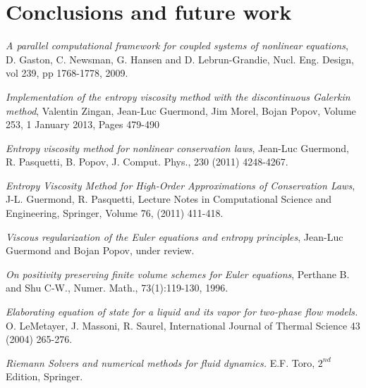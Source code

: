 \documentclass{article}
\begin{document}
\section{Conclusions and future work}
\newpage
{}
\begin{thebibliography}{7}
    
  \emph{A parallel computational framework for coupled systems of nonlinear equations},
  D. Gaston, C. Newsman, G. Hansen and D. Lebrun-Grandie, Nucl. Eng. Design, vol 239, pp 1768-1778, 2009.
  
  \emph{Implementation of the entropy viscosity method with the discontinuous Galerkin method},
  Valentin Zingan, Jean-Luc Guermond, Jim Morel, Bojan Popov, Volume 253, 1 January 2013, Pages 479-490
  
  {\em Entropy viscosity method for nonlinear conservation laws}, 
  Jean-Luc Guermond, R. Pasquetti, B. Popov, J. Comput. Phys., 230 (2011) 4248-4267.
  
  {\em Entropy Viscosity Method for High-Order Approximations of Conservation Laws}, 
  J-L. Guermond, R. Pasquetti, 
  Lecture Notes in Computational Science and Engineering, Springer, Volume 76, (2011) 411-418.
  
  \emph{Viscous regularization of the Euler equations and entropy principles},
  Jean-Luc Guermond and Bojan Popov, under review.
  
  \emph{On positivity preserving finite volume schemes for Euler equations},
  Perthane B. and Shu C-W., Numer. Math., 73(1):119-130, 1996.
  
  \emph{Elaborating equation of state for a liquid and its vapor for two-phase flow models.}
  O. LeMetayer, J. Massoni, R. Saurel, International Journal of Thermal Science 43 (2004) 265-276.

  \emph{Riemann Solvers and numerical methods for fluid dynamics.}
  E.F. Toro, $2^{nd}$ Edition, Springer.  
  
  
  \end{thebibliography}
\end{document}
